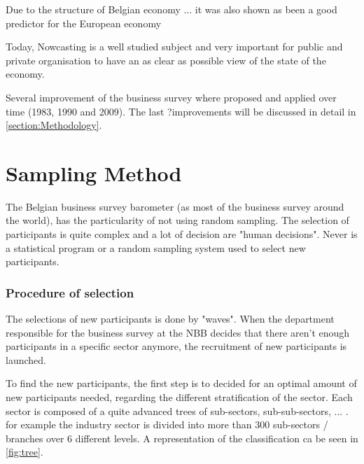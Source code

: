 \documentclass[12pt,a4paper,oneside]{book}
\begin{document}
Due to the structure of Belgian economy ... it was also shown as been a good predictor for the European economy \cite{vanhaelen_belgian_2000}

Today, Nowcasting is a well studied subject and very important for public and private organisation to have an as clear as possible view of the state of the economy.

Several improvement of the business survey where proposed and applied over time (1983, 1990 and 2009). The last ?improvements will be discussed in detail in \autoref{section:Methodology}.


\section{Sampling Method}
\label{sec:Recruitment of participants}

The Belgian business survey barometer (as most of the business survey around the world), has the particularity of not using random sampling.
The selection of participants is quite complex and a lot of decision are "human decisions". Never is a statistical program or a random sampling system used to select new participants.

\subsubsection{Procedure of selection}

The selections of new participants is done by "waves". When the department responsible for the business survey at the NBB decides that there aren't enough participants in a specific sector anymore, the recruitment of new participants is launched. 

To find the new participants, the first step is to decided for an optimal amount of new participants needed, regarding the different stratification of the sector.
Each sector is composed of a quite advanced trees of sub-sectors, sub-sub-sectors, ... . for example the industry sector is divided into more than 300 sub-sectors / branches over 6 different levels. A representation of the classification ca be seen in \autoref{fig:tree}.

\end{document}
